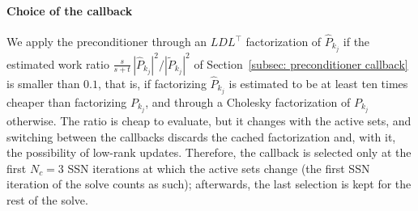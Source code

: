 \paragraph{Choice of the callback} We apply the preconditioner through an $LDL^\top$ factorization of $\widehat{P}_{k_j}$ if the estimated work ratio $\frac{s}{s+t}\,|\widehat{P}_{k_j}|^2 / |\widetilde{P}_{k_j}|^2$ of Section~\ref{subsec: preconditioner callback} is smaller than $0.1$, that is, if factorizing $\widehat{P}_{k_j}$ is estimated to be at least ten times cheaper than factorizing $P_{k_j}$, and through a Cholesky factorization of $P_{k_j}$ otherwise. The ratio is cheap to evaluate, but it changes with the active sets, and switching between the callbacks discards the cached factorization and, with it, the possibility of low-rank updates. Therefore, the callback is selected only at the first $N_c = 3$ SSN iterations at which the active sets change (the first SSN iteration of the solve counts as such); afterwards, the last selection is kept for the rest of the solve.

